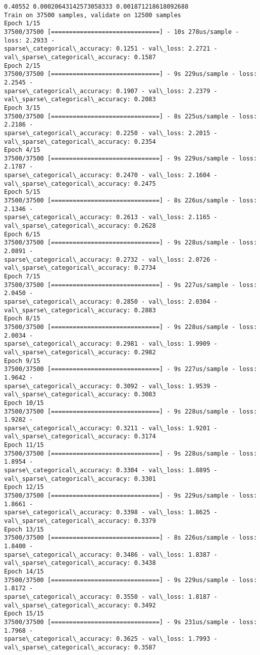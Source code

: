 \documentclass[11pt]{article}
\begin{document}
    \begin{Verbatim}[commandchars=\\\{\}]
0.40552 0.00020643142573058333 0.001871218618092688
Train on 37500 samples, validate on 12500 samples
Epoch 1/15
37500/37500 [==============================] - 10s 278us/sample - loss: 2.2933 -
sparse\_categorical\_accuracy: 0.1251 - val\_loss: 2.2721 -
val\_sparse\_categorical\_accuracy: 0.1587
Epoch 2/15
37500/37500 [==============================] - 9s 229us/sample - loss: 2.2545 -
sparse\_categorical\_accuracy: 0.1907 - val\_loss: 2.2379 -
val\_sparse\_categorical\_accuracy: 0.2083
Epoch 3/15
37500/37500 [==============================] - 8s 225us/sample - loss: 2.2186 -
sparse\_categorical\_accuracy: 0.2250 - val\_loss: 2.2015 -
val\_sparse\_categorical\_accuracy: 0.2354
Epoch 4/15
37500/37500 [==============================] - 9s 229us/sample - loss: 2.1787 -
sparse\_categorical\_accuracy: 0.2470 - val\_loss: 2.1604 -
val\_sparse\_categorical\_accuracy: 0.2475
Epoch 5/15
37500/37500 [==============================] - 8s 226us/sample - loss: 2.1346 -
sparse\_categorical\_accuracy: 0.2613 - val\_loss: 2.1165 -
val\_sparse\_categorical\_accuracy: 0.2628
Epoch 6/15
37500/37500 [==============================] - 9s 228us/sample - loss: 2.0891 -
sparse\_categorical\_accuracy: 0.2732 - val\_loss: 2.0726 -
val\_sparse\_categorical\_accuracy: 0.2734
Epoch 7/15
37500/37500 [==============================] - 9s 227us/sample - loss: 2.0450 -
sparse\_categorical\_accuracy: 0.2850 - val\_loss: 2.0304 -
val\_sparse\_categorical\_accuracy: 0.2883
Epoch 8/15
37500/37500 [==============================] - 9s 228us/sample - loss: 2.0034 -
sparse\_categorical\_accuracy: 0.2981 - val\_loss: 1.9909 -
val\_sparse\_categorical\_accuracy: 0.2982
Epoch 9/15
37500/37500 [==============================] - 9s 227us/sample - loss: 1.9642 -
sparse\_categorical\_accuracy: 0.3092 - val\_loss: 1.9539 -
val\_sparse\_categorical\_accuracy: 0.3083
Epoch 10/15
37500/37500 [==============================] - 9s 228us/sample - loss: 1.9282 -
sparse\_categorical\_accuracy: 0.3211 - val\_loss: 1.9201 -
val\_sparse\_categorical\_accuracy: 0.3174
Epoch 11/15
37500/37500 [==============================] - 9s 228us/sample - loss: 1.8954 -
sparse\_categorical\_accuracy: 0.3304 - val\_loss: 1.8895 -
val\_sparse\_categorical\_accuracy: 0.3301
Epoch 12/15
37500/37500 [==============================] - 9s 229us/sample - loss: 1.8661 -
sparse\_categorical\_accuracy: 0.3398 - val\_loss: 1.8625 -
val\_sparse\_categorical\_accuracy: 0.3379
Epoch 13/15
37500/37500 [==============================] - 8s 226us/sample - loss: 1.8400 -
sparse\_categorical\_accuracy: 0.3486 - val\_loss: 1.8387 -
val\_sparse\_categorical\_accuracy: 0.3438
Epoch 14/15
37500/37500 [==============================] - 9s 229us/sample - loss: 1.8172 -
sparse\_categorical\_accuracy: 0.3550 - val\_loss: 1.8187 -
val\_sparse\_categorical\_accuracy: 0.3492
Epoch 15/15
37500/37500 [==============================] - 9s 231us/sample - loss: 1.7968 -
sparse\_categorical\_accuracy: 0.3625 - val\_loss: 1.7993 -
val\_sparse\_categorical\_accuracy: 0.3587
    \end{Verbatim}
\end{document}
